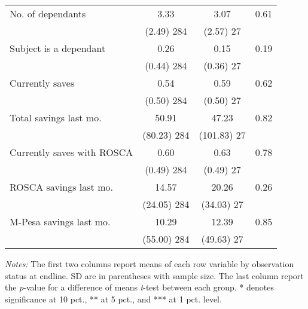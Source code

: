 \begin{table}[htbp]
{\begin{threeparttable}
\begin{tabular}{l*{3}{c}}
No. of dependants&     3.33&     3.07&     0.61\\
          &(2.49) 284 &(2.57) 27 &         \\
Subject is a dependant&     0.26&     0.15&     0.19\\
          &(0.44) 284 &(0.36) 27 &         \\
Currently saves&     0.54&     0.59&     0.62\\
          &(0.50) 284 &(0.50) 27 &         \\
Total savings last mo.&    50.91&    47.23&     0.82\\
          &(80.23) 284 &(101.83) 27 &         \\
Currently saves with ROSCA&     0.60&     0.63&     0.78\\
          &(0.49) 284 &(0.49) 27 &         \\
ROSCA savings last mo.&    14.57&    20.26&     0.26\\
          &(24.05) 284 &(34.03) 27 &         \\
M-Pesa savings last mo.&    10.29&    12.39&     0.85\\
          &(55.00) 284 &(49.63) 27 &         \\
\bottomrule \end{tabular} \begin{tablenotes}[flushleft] \footnotesize \item \emph{Notes:} The first two columns report means of each row variable by observation status at endline. SD are in parentheses with sample size. The last column report the \emph{p}-value for a difference of means \emph{t}-test between each group. * denotes significance at 10 pct., ** at 5 pct., and *** at 1 pct. level. \end{tablenotes} \end{threeparttable} } \end{table}

